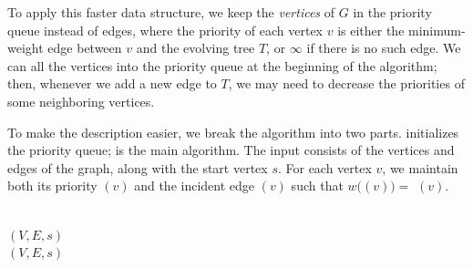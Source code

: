 To apply this faster data structure, we keep the \textit{vertices} of $G$ in the priority queue instead of edges, where the priority of each vertex $v$ is either the minimum-weight edge between $v$ and the evolving tree $T$, or $\infty$  if there is no such edge. We can  all the vertices into the priority queue at the beginning of the algorithm; then, whenever we add a new edge to $T$, we may need to decrease the priorities of some neighboring vertices.

To make the description easier, we break the algorithm into two parts.  initializes the priority queue;  is the main algorithm. The input consists of the vertices and edges of the graph, along with the start vertex $s$. For each vertex $v$, we maintain both its priority $(v)$ and the incident edge $(v)$ such that $w($$(v)) =$ $(v)$.

\begin{pseudocode}
\\
$(V, E,s)$\\
$(V, E,s)$
\end{pseudocode}

